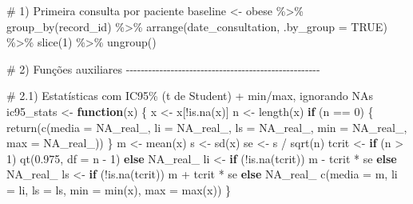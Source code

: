 \documentclass[
]{article}
\newenvironment{Shaded}{\begin{snugshade}}{\end{snugshade}}
\newcommand{\AttributeTok}[1]{\textcolor[rgb]{0.40,0.45,0.13}{#1}}
\newcommand{\CommentTok}[1]{\textcolor[rgb]{0.37,0.37,0.37}{#1}}
\newcommand{\ConstantTok}[1]{\textcolor[rgb]{0.56,0.35,0.01}{#1}}
\newcommand{\ControlFlowTok}[1]{\textcolor[rgb]{0.00,0.23,0.31}{\textbf{#1}}}
\newcommand{\DecValTok}[1]{\textcolor[rgb]{0.68,0.00,0.00}{#1}}
\newcommand{\FloatTok}[1]{\textcolor[rgb]{0.68,0.00,0.00}{#1}}
\newcommand{\FunctionTok}[1]{\textcolor[rgb]{0.28,0.35,0.67}{#1}}
\newcommand{\NormalTok}[1]{\textcolor[rgb]{0.00,0.23,0.31}{#1}}
\newcommand{\OtherTok}[1]{\textcolor[rgb]{0.00,0.23,0.31}{#1}}
\newcommand{\SpecialCharTok}[1]{\textcolor[rgb]{0.37,0.37,0.37}{#1}}
\begin{document}
\begin{Shaded}
\begin{Highlighting}[]
\CommentTok{\# 1) Primeira consulta por paciente}
\NormalTok{baseline }\OtherTok{\textless{}{-}}\NormalTok{ obese }\SpecialCharTok{\%\textgreater{}\%}
  \FunctionTok{group\_by}\NormalTok{(record\_id) }\SpecialCharTok{\%\textgreater{}\%}
  \FunctionTok{arrange}\NormalTok{(date\_consultation, }\AttributeTok{.by\_group =} \ConstantTok{TRUE}\NormalTok{) }\SpecialCharTok{\%\textgreater{}\%}
  \FunctionTok{slice}\NormalTok{(}\DecValTok{1}\NormalTok{) }\SpecialCharTok{\%\textgreater{}\%}
  \FunctionTok{ungroup}\NormalTok{()}

\CommentTok{\# 2) Funções auxiliares {-}{-}{-}{-}{-}{-}{-}{-}{-}{-}{-}{-}{-}{-}{-}{-}{-}{-}{-}{-}{-}{-}{-}{-}{-}{-}{-}{-}{-}{-}{-}{-}{-}{-}{-}{-}{-}{-}{-}{-}{-}{-}{-}{-}{-}{-}{-}{-}{-}{-}{-}{-}}

\CommentTok{\# 2.1) Estatísticas com IC95\% (t de Student) + min/max, ignorando NAs}
\NormalTok{ic95\_stats }\OtherTok{\textless{}{-}} \ControlFlowTok{function}\NormalTok{(x) \{}
\NormalTok{  x }\OtherTok{\textless{}{-}}\NormalTok{ x[}\SpecialCharTok{!}\FunctionTok{is.na}\NormalTok{(x)]}
\NormalTok{  n  }\OtherTok{\textless{}{-}} \FunctionTok{length}\NormalTok{(x)}
  \ControlFlowTok{if}\NormalTok{ (n }\SpecialCharTok{==} \DecValTok{0}\NormalTok{) \{}
    \FunctionTok{return}\NormalTok{(}\FunctionTok{c}\NormalTok{(}\AttributeTok{media =} \ConstantTok{NA\_real\_}\NormalTok{, }\AttributeTok{li =} \ConstantTok{NA\_real\_}\NormalTok{, }\AttributeTok{ls =} \ConstantTok{NA\_real\_}\NormalTok{, }\AttributeTok{min =} \ConstantTok{NA\_real\_}\NormalTok{, }\AttributeTok{max =} \ConstantTok{NA\_real\_}\NormalTok{))}
\NormalTok{  \}}
\NormalTok{  m  }\OtherTok{\textless{}{-}} \FunctionTok{mean}\NormalTok{(x)}
\NormalTok{  s  }\OtherTok{\textless{}{-}} \FunctionTok{sd}\NormalTok{(x)}
\NormalTok{  se }\OtherTok{\textless{}{-}}\NormalTok{ s }\SpecialCharTok{/} \FunctionTok{sqrt}\NormalTok{(n)}
\NormalTok{  tcrit }\OtherTok{\textless{}{-}} \ControlFlowTok{if}\NormalTok{ (n }\SpecialCharTok{\textgreater{}} \DecValTok{1}\NormalTok{) }\FunctionTok{qt}\NormalTok{(}\FloatTok{0.975}\NormalTok{, }\AttributeTok{df =}\NormalTok{ n }\SpecialCharTok{{-}} \DecValTok{1}\NormalTok{) }\ControlFlowTok{else} \ConstantTok{NA\_real\_}
\NormalTok{  li }\OtherTok{\textless{}{-}} \ControlFlowTok{if}\NormalTok{ (}\SpecialCharTok{!}\FunctionTok{is.na}\NormalTok{(tcrit)) m }\SpecialCharTok{{-}}\NormalTok{ tcrit }\SpecialCharTok{*}\NormalTok{ se }\ControlFlowTok{else} \ConstantTok{NA\_real\_}
\NormalTok{  ls }\OtherTok{\textless{}{-}} \ControlFlowTok{if}\NormalTok{ (}\SpecialCharTok{!}\FunctionTok{is.na}\NormalTok{(tcrit)) m }\SpecialCharTok{+}\NormalTok{ tcrit }\SpecialCharTok{*}\NormalTok{ se }\ControlFlowTok{else} \ConstantTok{NA\_real\_}
  \FunctionTok{c}\NormalTok{(}\AttributeTok{media =}\NormalTok{ m, }\AttributeTok{li =}\NormalTok{ li, }\AttributeTok{ls =}\NormalTok{ ls, }\AttributeTok{min =} \FunctionTok{min}\NormalTok{(x), }\AttributeTok{max =} \FunctionTok{max}\NormalTok{(x))}
\NormalTok{\}}


\end{Highlighting}
\end{Shaded}
\end{document}
